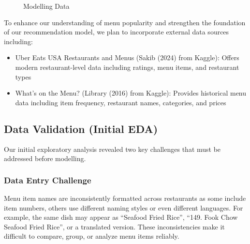\documentclass[
  11pt,
  a4paper,
  DIV=11,
  numbers=noendperiod]{scrartcl}
\providecommand{\tightlist}{%
  \setlength{\itemsep}{0pt}\setlength{\parskip}{0pt}}\usepackage{longtable,booktabs,array}
\begin{document}
\begin{figure}

\caption{\label{fig-model-structure}Modelling Data}


\end{figure}%

To enhance our understanding of menu popularity and strengthen the
foundation of our recommendation model, we plan to incorporate external
data sources including:

\begin{itemize}
\tightlist
\item
  Uber Eats USA Restaurants and Menus (Sakib (2024) from Kaggle): Offers
  modern restaurant-level data including ratings, menu items, and
  restaurant types
\item
  What's on the Menu? (Library (2016) from Kaggle): Provides historical
  menu data including item frequency, restaurant names, categories, and
  prices
\end{itemize}

\subsection{Data Validation (Initial
EDA)}\label{data-validation-initial-eda}

Our initial exploratory analysis revealed two key challenges that must
be addressed before modelling.

\subsubsection{Data Entry Challenge}\label{data-entry-challenge}

Menu item names are inconsistently formatted across restaurants as some
include item numbers, others use different naming styles or even
different languages. For example, the same dish may appear as ``Seafood
Fried Rice'', ``149. Fook Chow Seafood Fried Rice'', or a translated
version. These inconsistencies make it difficult to compare, group, or
analyze menu items reliably.
\end{document}
